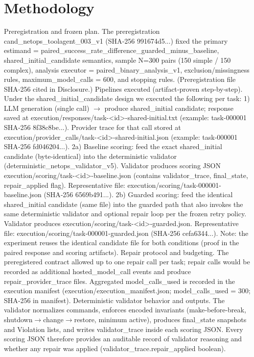 \documentclass[conference]{IEEEtran}
\begin{document}
\section{Methodology}
Preregistration and frozen plan. The preregistration cand\_netops\_toolagent\_003\_v1 (SHA‑256 991674d5...) fixed the primary estimand = paired\_success\_rate\_difference\_guarded\_minus\_baseline, shared\_initial\_candidate semantics, sample N=300 pairs (150 simple / 150 complex), analysis executor = paired\_binary\_analysis\_v1, exclusion/missingness rules, maximum\_model\_calls = 600, and stopping rules. (Preregistration file SHA‑256 cited in Disclosure.)
Pipelines executed (artifact‑proven step‑by‑step). Under the shared\_initial\_candidate design we executed the following per task:
1) LLM generation (single call) \ensuremath{\rightarrow} produce shared\_initial candidate; response saved at execution/responses/task-<id>-shared-initial.txt (example: task-000001 SHA‑256 8f38c8be...). Provider trace for that call stored at execution/provider\_calls/task-<id>-shared-initial.json (example: task-000001 SHA‑256 fd046204...).
2a) Baseline scoring: feed the exact shared\_initial candidate (byte‑identical) into the deterministic validator (deterministic\_netops\_validator\_v5). Validator produces scoring JSON execution/scoring/task-<id>-baseline.json (contains validator\_trace, final\_state, repair\_applied flag). Representative file: execution/scoring/task-000001-baseline.json (SHA‑256 6569b491...).
2b) Guarded scoring: feed the identical shared\_initial candidate (same file) into the guarded path that also invokes the same deterministic validator and optional repair loop per the frozen retry policy. Validator produces execution/scoring/task-<id>-guarded.json. Representative file: execution/scoring/task-000001-guarded.json (SHA‑256 cefa6344...).
Note: the experiment reuses the identical candidate file for both conditions (proof in the paired response and scoring artifacts). Repair protocol and budgeting. The preregistered contract allowed up to one repair call per task; repair calls would be recorded as additional hosted\_model\_call events and produce repair\_provider\_trace files. Aggregated model\_calls\_used is recorded in the execution manifest (execution/execution\_manifest.json; model\_calls\_used = 300; SHA‑256 in manifest). Deterministic validator behavior and outputs. The validator normalizes commands, enforces encoded invariants (make‑before‑break, shutdown\ensuremath{\rightarrow}change\ensuremath{\rightarrow}restore, minimum active), produces final\_state snapshots and Violation lists, and writes validator\_trace inside each scoring JSON. Every scoring JSON therefore provides an auditable record of validator reasoning and whether any repair was applied (validator\_trace.repair\_applied boolean).
\end{document}
